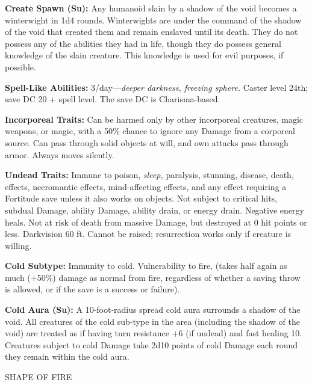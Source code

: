 \documentclass{article}
\begin{document}
{\textbf{Create Spawn (Su):} Any humanoid slain by a shadow of the void becomes 
a winterwight in 1d4 rounds. Winterwights are under the command of the shadow of 
the void that created them and remain enslaved until its death. They do not possess 
any of the abilities they had in life, though they do possess general knowledge 
of the slain creature. This knowledge is used for evil purposes, if possible. 

\textbf{Spell-Like Abilities: }3/day---\textit{deeper darkness, freezing sphere. 
}Caster level 24th; save DC 20 + spell level. The save DC is Charisma-based.

\textbf{Incorporeal Traits:} Can be harmed only by other incorporeal creatures, 
magic weapons, or magic, with a 50\% chance to ignore any Damage from a corporeal 
source. Can pass through solid objects at will, and own attacks pass through armor. 
Always moves silently. 

\textbf{Undead Traits:} Immune to poison, \textit{sleep, }paralysis, stunning, 
disease, death, effects, necromantic effects, mind-affecting effects, and any effect 
requiring a Fortitude save unless it also works on objects. Not subject to critical 
hits, subdual Damage, ability Damage, ability drain, or energy drain. Negative 
energy heals. Not at risk of death from massive Damage, but destroyed at 0 hit 
points or less. Darkvision 60 ft. Cannot be raised; resurrection works only if 
creature is willing. 

\textbf{Cold Subtype: }Immunity to cold. Vulnerability to fire, (takes half again 
as much (+50\%) damage as normal from fire, regardless of whether a saving throw 
is allowed, or if the save is a success or failure). 

\textbf{Cold Aura (Su):} A 10-foot-radius spread cold aura surrounds a shadow of 
the void. All creatures of the cold sub-type in the area (including the shadow 
of the void) are treated as if having turn resistance +6 (if undead) and fast healing 
10. Creatures subject to cold Damage take 2d10 points of cold Damage each round 
they remain within the cold aura. 

\vspace{12pt}
{\LARGE{}SHAPE OF FIRE }

}
\end{document}
